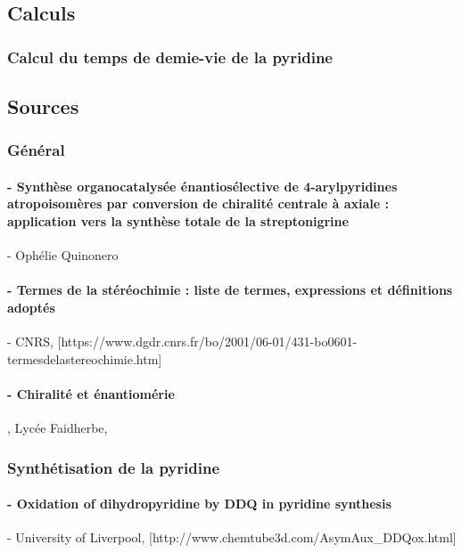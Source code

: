 \documentclass{article}
\begin{document}
\medbreak

\subsection{Calculs}

\subsubsection*{Calcul du temps de demie-vie de la pyridine}

\newpage

\subsection{Sources}

\subsubsection*{Général}


\paragraph{- \quad Synthèse organocatalysée énantiosélective de 4-arylpyridines atropoisomères par conversion de chiralité centrale à axiale : application vers la synthèse totale de la streptonigrine} - Ophélie Quinonero

\paragraph{- \quad Termes de la stéréochimie : liste de termes, expressions et définitions adoptés} - CNRS, [https://www.dgdr.cnrs.fr/bo/2001/06-01/431-bo0601-termesdelastereochimie.htm]

\paragraph{- \quad Chiralité et énantiomérie}, Lycée Faidherbe,  \par [https://www.faidherbe.org/site/cours/dupuis/enantio.htm]


\subsubsection*{Synthétisation de la pyridine}

\paragraph{- \quad Oxidation of dihydropyridine by DDQ in pyridine synthesis} - University of Liverpool, [http://www.chemtube3d.com/AsymAux\_DDQox.html]
\end{document}
